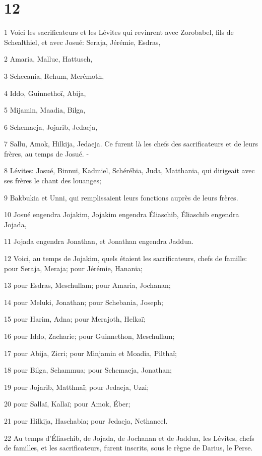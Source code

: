 \chapter{12}

\par 1 Voici les sacrificateurs et les Lévites qui revinrent avec Zorobabel, fils de Schealthiel, et avec Josué: Seraja, Jérémie, Esdras,
\par 2 Amaria, Malluc, Hattusch,
\par 3 Schecania, Rehum, Merémoth,
\par 4 Iddo, Guinnethoï, Abija,
\par 5 Mijamin, Maadia, Bilga,
\par 6 Schemaeja, Jojarib, Jedaeja,
\par 7 Sallu, Amok, Hilkija, Jedaeja. Ce furent là les chefs des sacrificateurs et de leurs frères, au temps de Josué. -
\par 8 Lévites: Josué, Binnuï, Kadmiel, Schérébia, Juda, Matthania, qui dirigeait avec ses frères le chant des louanges;
\par 9 Bakbukia et Unni, qui remplissaient leurs fonctions auprès de leurs frères.
\par 10 Josué engendra Jojakim, Jojakim engendra Éliaschib, Éliaschib engendra Jojada,
\par 11 Jojada engendra Jonathan, et Jonathan engendra Jaddua.
\par 12 Voici, au temps de Jojakim, quels étaient les sacrificateurs, chefs de famille: pour Seraja, Meraja; pour Jérémie, Hanania;
\par 13 pour Esdras, Meschullam; pour Amaria, Jochanan;
\par 14 pour Meluki, Jonathan; pour Schebania, Joseph;
\par 15 pour Harim, Adna; pour Merajoth, Helkaï;
\par 16 pour Iddo, Zacharie; pour Guinnethon, Meschullam;
\par 17 pour Abija, Zicri; pour Minjamin et Moadia, Pilthaï;
\par 18 pour Bilga, Schammua; pour Schemaeja, Jonathan;
\par 19 pour Jojarib, Matthnaï; pour Jedaeja, Uzzi;
\par 20 pour Sallaï, Kallaï; pour Amok, Éber;
\par 21 pour Hilkija, Haschabia; pour Jedaeja, Nethaneel.
\par 22 Au temps d'Éliaschib, de Jojada, de Jochanan et de Jaddua, les Lévites, chefs de familles, et les sacrificateurs, furent inscrits, sous le règne de Darius, le Perse.
